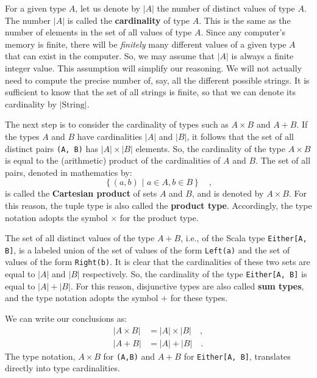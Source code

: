 For a given type $A$, let us denote by $\left|A\right|$ the number
of distinct values of type $A$. The number $\left|A\right|$ is called
the \textbf{cardinality} of type $A$. This is
the same as the number of elements in the set of all values of type
$A$. Since any computer\textsf{'}s memory is finite, there will be \emph{finitely}
many different values of a given type $A$ that can exist in the computer.
So, we may assume that $\left|A\right|$ is always a finite integer
value. This assumption will simplify our reasoning. We will not actually
need to compute the precise number of, say, all the different possible
strings. It is sufficient to know that the set of all strings is finite,
so that we can denote its cardinality by $|\text{String}|$.

The next step is to consider the cardinality of types such as $A\times B$
and $A+B$. If the types $A$ and $B$ have cardinalities $\left|A\right|$
and $\left|B\right|$, it follows that the set of all distinct pairs
\lstinline!(A, B)! has $\left|A\right|\times\left|B\right|$ elements.
So, the cardinality of the type $A\times B$ is equal to the (arithmetic)
product of the cardinalities of $A$ and $B$. The set of all pairs,
denoted in mathematics by:
\[
\left\{ (a,b)\,\,|\,\,a\in A,b\in B\right\} \quad,
\]
is called the \textbf{Cartesian product}
of sets $A$ and $B$, and is denoted by $A\times B$. For this reason,
the tuple type is also called the \textbf{product
type}. Accordingly, the type notation adopts the symbol $\times$
for the product type.

The set of all distinct values of the type $A+B$, i.e., of the Scala
type \lstinline!Either[A, B]!, is a labeled
union of the set of values of the form \lstinline!Left(a)! and the
set of values of the form \lstinline!Right(b)!. It is clear that
the cardinalities of these two sets are equal to $\left|A\right|$
and $\left|B\right|$ respectively. So, the cardinality of the type
\lstinline!Either[A, B]! is equal to $\left|A\right|+\left|B\right|$.
For this reason, disjunctive types are also called \textbf{sum
types}, and the type notation adopts the symbol $+$ for these types.

We can write our conclusions as:
\begin{align*}
\left|A\times B\right| & =\left|A\right|\times\left|B\right|\quad,\\
\left|A+B\right| & =\left|A\right|+\left|B\right|\quad.
\end{align*}
The type notation, $A\times B$ for \lstinline!(A,B)! and $A+B$
for \lstinline!Either[A, B]!, translates directly into type cardinalities.

